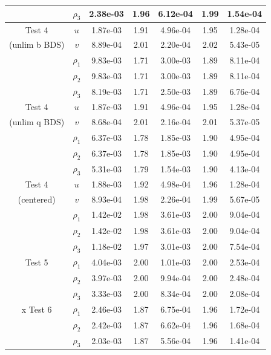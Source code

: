 \documentclass[final]{siamltex}
\begin{document}
\begin{table}[h]
\begin{center}
\begin{tabular}{ccccccc}
                    & $\rho_3$ & 2.38e-03 & 1.96 & 6.12e-04 & 1.99 & 1.54e-04 \\
\hline
Test 4              & $u$      & 1.87e-03 & 1.91 & 4.96e-04 & 1.95 & 1.28e-04 \\
(unlim b BDS)       & $v$      & 8.89e-04 & 2.01 & 2.20e-04 & 2.02 & 5.43e-05 \\
                    & $\rho_1$ & 9.83e-03 & 1.71 & 3.00e-03 & 1.89 & 8.11e-04 \\
                    & $\rho_2$ & 9.83e-03 & 1.71 & 3.00e-03 & 1.89 & 8.11e-04 \\
                    & $\rho_3$ & 8.19e-03 & 1.71 & 2.50e-03 & 1.89 & 6.76e-04 \\
\hline
Test 4              & $u$      & 1.87e-03 & 1.91 & 4.96e-04 & 1.95 & 1.28e-04 \\
(unlim q BDS)       & $v$      & 8.68e-04 & 2.01 & 2.16e-04 & 2.01 & 5.37e-05 \\
                    & $\rho_1$ & 6.37e-03 & 1.78 & 1.85e-03 & 1.90 & 4.95e-04 \\
                    & $\rho_2$ & 6.37e-03 & 1.78 & 1.85e-03 & 1.90 & 4.95e-04 \\
                    & $\rho_3$ & 5.31e-03 & 1.79 & 1.54e-03 & 1.90 & 4.13e-04 \\
\hline
Test 4              & $u$      & 1.88e-03 & 1.92 & 4.98e-04 & 1.96 & 1.28e-04 \\
(centered)          & $v$      & 8.93e-04 & 1.98 & 2.26e-04 & 1.99 & 5.67e-05 \\
                    & $\rho_1$ & 1.42e-02 & 1.98 & 3.61e-03 & 2.00 & 9.04e-04 \\
                    & $\rho_2$ & 1.42e-02 & 1.98 & 3.61e-03 & 2.00 & 9.04e-04 \\
                    & $\rho_3$ & 1.18e-02 & 1.97 & 3.01e-03 & 2.00 & 7.54e-04 \\
\hline
Test 5              & $\rho_1$ & 4.04e-03 & 2.00 & 1.01e-03 & 2.00 & 2.53e-04 \\
                    & $\rho_2$ & 3.97e-03 & 2.00 & 9.94e-04 & 2.00 & 2.48e-04 \\
                    & $\rho_3$ & 3.33e-03 & 2.00 & 8.34e-04 & 2.00 & 2.08e-04 \\
\hline
x Test 6            & $\rho_1$ & 2.46e-03 & 1.87 & 6.75e-04 & 1.96 & 1.72e-04 \\
                    & $\rho_2$ & 2.42e-03 & 1.87 & 6.62e-04 & 1.96 & 1.68e-04 \\
                    & $\rho_3$ & 2.03e-03 & 1.87 & 5.56e-04 & 1.96 & 1.41e-04 \\

\end{tabular}
\end{center}
\end{table}
\end{document}
